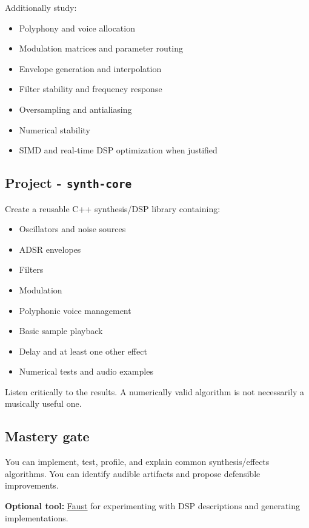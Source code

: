 \documentclass[11pt,letterpaper]{article}
\begin{document}
Additionally study:

\begin{itemize}
\item Polyphony and voice allocation
\item Modulation matrices and parameter routing
\item Envelope generation and interpolation
\item Filter stability and frequency response
\item Oversampling and antialiasing
\item Numerical stability
\item SIMD and real-time DSP optimization when justified
\end{itemize}

\subsection*{Project - \texttt{synth-core}}\label{project-synth-core}

Create a reusable C++ synthesis/DSP library containing:

\begin{itemize}
\item Oscillators and noise sources
\item ADSR envelopes
\item Filters
\item Modulation
\item Polyphonic voice management
\item Basic sample playback
\item Delay and at least one other effect
\item Numerical tests and audio examples
\end{itemize}

Listen critically to the results. A numerically valid algorithm is not necessarily a musically useful one.

\subsection*{Mastery gate}\label{mastery-gate-3}

You can implement, test, profile, and explain common synthesis/effects algorithms. You can identify audible artifacts and propose defensible improvements.

\textbf{Optional tool:} \href{https://faust.grame.fr/}{Faust} for experimenting with DSP descriptions and generating implementations.
\end{document}
